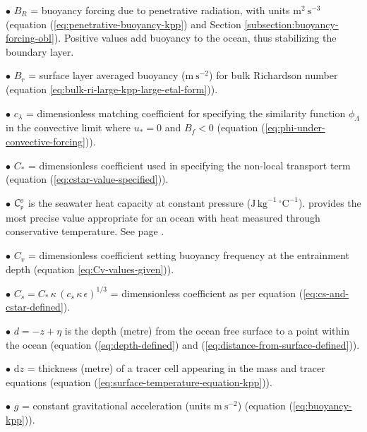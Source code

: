 \begin{trivlist}
\item[$\bullet$] $B_{R}$ = buoyancy forcing due to penetrative
  radiation, with units $\mbox{m}^{2}~\mbox{s}^{-3}$ (equation
  (\ref{eq:penetrative-buoyancy-kpp}) and Section
  \ref{subsection:buoyancy-forcing-obl}).  Positive values add
  buoyancy to the ocean, thus stabilizing the boundary layer.

\item[$\bullet$] $B_{r}$ = surface layer averaged buoyancy
  ($\mbox{m}~\mbox{s}^{-2}$) for bulk Richardson number (equation
  \ref{eq:bulk-ri-large-kpp-large-etal-form})).

\item[$\bullet$] $c_{\lambda}$ = dimensionless matching coefficient
  for specifying the similarity function $\phi_{\Lambda}$ in the
  convective limit where $u_{*} = 0$ and $B_{f} < 0$ (equation
  (\ref{eq:phi-under-convective-forcing})).

\item[$\bullet$] $C_{*}$ = dimensionless coefficient used in
  specifying the non-local transport term (equation
  (\ref{eq:cstar-value-specified})).

\item[$\bullet$] $C_{\mbox{\tiny p}}^{o}$ is the seawater heat capacity at constant
  pressure ($\mbox{J} \, \mbox{kg}^{-1} \,
  \mbox{}^{\circ}\mbox{C}^{-1}$).  \cite{TEOS2010} provides the most
  precise value appropriate for an ocean with heat measured through
  conservative temperature.  See page \pageref{heat_capacity}.

\item[$\bullet$] $C_{v}$ = dimensionless coefficient setting buoyancy
  frequency at the entrainment depth (equation
  \ref{eq:Cv-values-given})).

\item[$\bullet$] $C_{s} = C_{*} \, \kappa \, (c_{s} \, \kappa \,
  \epsilon)^{1/3}$ = dimensionless coefficient as per equation
  (\ref{eq:cs-and-cstar-defined}).

\item[$\bullet$] $d = -z + \eta$ is the depth (metre) from the ocean free surface
  to a point within the ocean (equation (\ref{eq:depth-defined}) and
  (\ref{eq:distance-from-surface-defined})).

\item[$\bullet$] $\mathrm{d}z$ = thickness (metre) of a tracer cell
  appearing in the mass and tracer equations (equation
  (\ref{eq:surface-temperature-equation-kpp})).

 \item[$\bullet$] $g$ = constant gravitational acceleration (units
   $\mbox{m}~\mbox{s}^{-2}$) (equation (\ref{eq:buoyancy-kpp})).


\end{trivlist}

